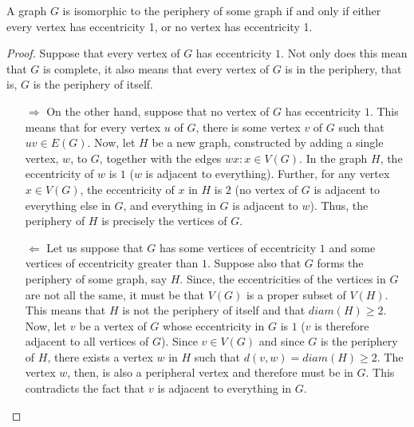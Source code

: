 \documentclass[../basic_graph_theory.tex]{subfiles}
\begin{document}
\begin{Thm}{}{}
    A graph $G$ is isomorphic to the periphery of some graph if and only if either every vertex has eccentricity 1, or no vertex has eccentricity 1.
\end{Thm}
\begin{proof}
    Suppose that every vertex of $G$ has eccentricity $1$. Not only does this mean that $G$ is complete, it also means that every vertex of $G$ is in the periphery, that is, $G$ is the periphery of itself.
    \begin{itemize}
        \item[$\Longrightarrow$] On the other hand, suppose that no vertex of $G$ has eccentricity $1$. This means that for every vertex $u$ of $G$, there is some vertex $v$ of $G$ such that $uv \in E(G)$. Now, let $H$ be a new graph, constructed by adding a single vertex, $w$, to $G$, together with the edges ${wx:x \in V (G)}$. In the graph $H$, the eccentricity of $w$ is $1$ ($w$ is adjacent to everything). Further, for any vertex $x \in V (G)$, the eccentricity of $x$ in $H$ is $2$ (no vertex of $G$ is adjacent to everything else in $G$, and everything in $G$ is adjacent to $w$). Thus, the periphery of $H$ is precisely the vertices of $G$.
        \item[$\Longleftarrow$] Let us suppose that $G$ has some vertices of eccentricity $1$ and some vertices of eccentricity greater than $1$. Suppose also that $G$ forms the periphery of some graph, say $H$. Since, the eccentricities of the vertices in $G$ are not all the same, it must be that $V(G)$ is a proper subset of $V(H)$. This means that $H$ is not the periphery of itself and that $diam(H) \ge 2$. Now, let $v$ be a vertex of $G$ whose eccentricity in $G$ is $1$ ($v$ is therefore adjacent to all vertices of $G$). Since $v \in V(G)$ and since $G$ is the periphery of $H$, there exists a vertex $w$ in $H$ such that $d(v,w) = diam(H) \ge 2$. The vertex $w$, then, is also a peripheral vertex and therefore must be in $G$. This contradicts the fact that $v$ is adjacent to everything in $G$.
    \end{itemize}
\end{proof}
\end{document}
